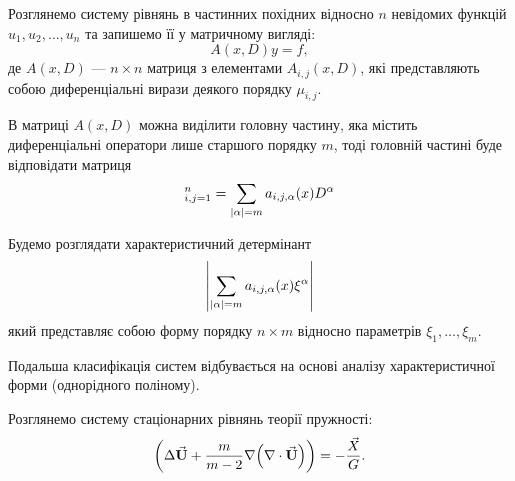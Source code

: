 Розглянемо систему рівнянь в частинних похідних відносно $n$ невідомих функцій $u_1, u_2, \ldots, u_n$ та запишемо її у матричному вигляді:
\begin{equation}
	A(x, D) y = f,
\end{equation}
де $A(x, D)$ --- $n \times n$ матриця з елементами $A_{i,j}(x,D)$, які представляють собою диференціальні вирази деякого порядку $\mu_{i,j}$. \medskip

В матриці $A(x,D)$ можна виділити головну частину, яка містить диференціальні оператори лише старшого порядку $m$, тоді головній частині буде відповідати матриця
\begin{equation}
	[A_0(x, D)]_{i,j=1}^n = \Sum_{|\alpha|=m} a_{i,j,\alpha} (x) D^\alpha
\end{equation}

Будемо розглядати характеристичний детермінант 
\begin{equation}
	\left| \displaystyle\sum\limits_{|\alpha|=m} a_{i,j,\alpha} (x) \xi^\alpha \right|
\end{equation}
який представляє собою форму порядку $n \times m$ відносно параметрів $\xi_1, \ldots, \xi_m$. \medskip

Подальша класифікація систем відбувається на основі аналізу характеристичної форми (однорідного поліному).

\begin{example}
	Розглянемо систему стаціонарних рівнянь теорії пружності:
	\begin{equation}
		\left( \Delta {\vec{\mathbf{U}}} + \frac{m}{m - 2} \nabla \Big(\nabla \cdot {\vec{\mathbf{U}}}\Big)\right) = - \frac{\vec X}{G}.
	\end{equation}
\end{example}

